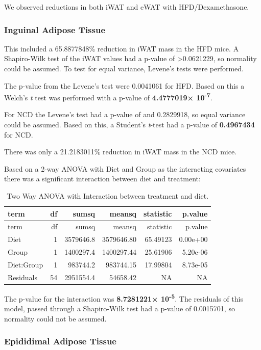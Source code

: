 \documentclass[]{article}
\begin{document}
We observed reductions in both iWAT and eWAT with HFD/Dexamethasone.

\subsubsection{Inguinal Adipose Tissue}\label{inguinal-adipose-tissue}

This included a 65.8877848\% reduction in iWAT mass in the HFD mice. A
Shapiro-Wilk test of the iWAT values had a p-value of
\textgreater{}0.0621229, so normality could be assumed. To test for
equal variance, Levene's tests were performed.

The p-value from the Levene's test were 0.0041061 for HFD. Based on this
a Welch's \emph{t} test was performed with a p-value of
\textbf{4.4777019× 10\textsuperscript{-7}}.

For NCD the Levene's test had a p-value of and 0.2829918, so equal
variance could be assumed. Based on this, a Student's \emph{t}-test had
a p-value of \textbf{0.4967434} for NCD.

There was only a 21.2183011\% reduction in iWAT mass in the NCD mice.

Based on a 2-way ANOVA with Diet and Group as the interacting covariates
there was a significant interaction between diet and treatment:

\begin{longtable}[]{@{}lrrrrr@{}}
\caption{Two Way ANOVA with Interaction between treatment and
diet.}\tabularnewline
\toprule
term & df & sumsq & meansq & statistic & p.value\tabularnewline
\midrule
\endfirsthead
\toprule
term & df & sumsq & meansq & statistic & p.value\tabularnewline
\midrule
\endhead
Diet & 1 & 3579646.8 & 3579646.80 & 65.49123 & 0.00e+00\tabularnewline
Group & 1 & 1400297.4 & 1400297.44 & 25.61906 & 5.20e-06\tabularnewline
Diet:Group & 1 & 983744.2 & 983744.15 & 17.99804 &
8.73e-05\tabularnewline
Residuals & 54 & 2951554.4 & 54658.42 & NA & NA\tabularnewline
\bottomrule
\end{longtable}

The p-value for the interaction was \textbf{8.7281221×
10\textsuperscript{-5}}. The residuals of this model, passed through a
Shapiro-Wilk test had a p-value of 0.0015701, so normality could not be
assumed.

\subsubsection{Epididimal Adipose
Tissue}\label{epididimal-adipose-tissue}
\end{document}
